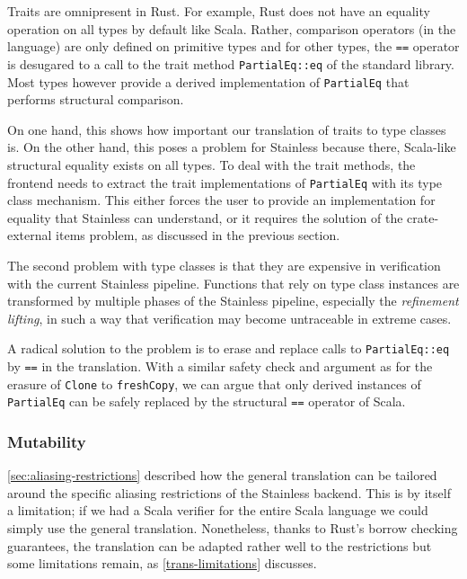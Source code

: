 Traits are omnipresent in Rust. For example, Rust does not have an
equality operation on all types by default like Scala. Rather,
comparison operators (in the language) are only defined on primitive
types and for other types, the \passthrough{\lstinline!==!} operator is
desugared to a call to the trait method
\passthrough{\lstinline!PartialEq::eq!} of the standard library. Most
types however provide a derived implementation of
\passthrough{\lstinline!PartialEq!} that performs structural comparison.

On one hand, this shows how important our translation of traits to type
classes is. On the other hand, this poses a problem for Stainless
because there, Scala-like structural equality exists on all types. To
deal with the trait methods, the frontend needs to extract the trait
implementations of \passthrough{\lstinline!PartialEq!} with its type
class mechanism. This either forces the user to provide an
implementation for equality that Stainless can understand, or it
requires the solution of the crate-external items problem, as discussed
in the previous section.

The second problem with type classes is that they are expensive in verification
with the current Stainless pipeline. Functions that rely on type class instances
are transformed by multiple phases of the Stainless pipeline, especially the
\emph{refinement lifting}, in such a way that verification may become
untraceable in extreme cases.

A radical solution to the problem is to erase and replace calls to
\passthrough{\lstinline!PartialEq::eq!} by \passthrough{\lstinline!==!}
in the translation. With a similar safety check and argument as for the
erasure of \passthrough{\lstinline!Clone!} to
\passthrough{\lstinline!freshCopy!}, we can argue that only derived
instances of \passthrough{\lstinline!PartialEq!} can be safely replaced
by the structural \passthrough{\lstinline!==!} operator of Scala.

\subsubsection{Mutability}

\autoref{sec:aliasing-restrictions} described how the general translation can be
tailored around the specific aliasing restrictions of the Stainless backend.
This is by itself a limitation; if we had a Scala verifier for the entire Scala
language we could simply use the general translation. Nonetheless, thanks to
Rust's borrow checking guarantees, the translation can be adapted rather well to
the restrictions but some limitations remain, as \autoref{trans-limitations}
discusses.

